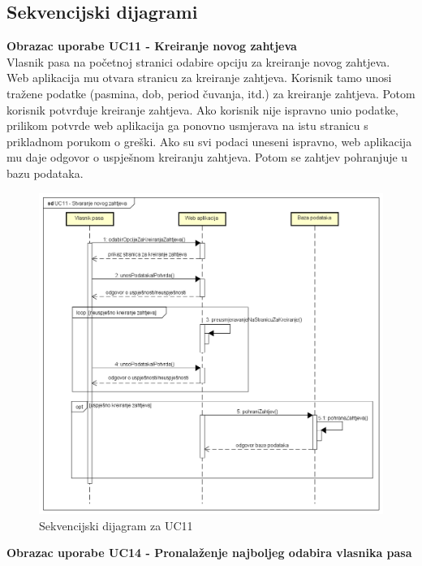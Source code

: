 			\subsection{Sekvencijski dijagrami}
				
				\textbf{Obrazac uporabe UC11 - Kreiranje novog zahtjeva}\\
				
				Vlasnik pasa na početnoj stranici odabire opciju za kreiranje novog zahtjeva. Web aplikacija mu otvara stranicu za kreiranje zahtjeva. Korisnik tamo unosi tražene podatke (pasmina, dob, period čuvanja, itd.) za kreiranje zahtjeva. Potom korisnik potvrđuje kreiranje zahtjeva. Ako korisnik nije ispravno unio podatke, prilikom potvrde web aplikacija ga ponovno usmjerava na istu stranicu s prikladnom porukom o greški. Ako su svi podaci uneseni ispravno, web aplikacija mu daje odgovor o uspješnom kreiranju zahtjeva. Potom se zahtjev pohranjuje u bazu podataka.
				
				\begin{figure}[htb]
					\centering
					\includegraphics[width=13cm]{slike/Sekvencijski dijagram - UC11}
					\caption{Sekvencijski dijagram za UC11}
					\label{fig:Sekvencijski-UC11}
				\end{figure}
				\eject		
				
				\textbf{Obrazac uporabe UC14 - Pronalaženje najboljeg odabira vlasnika pasa}\\
				
